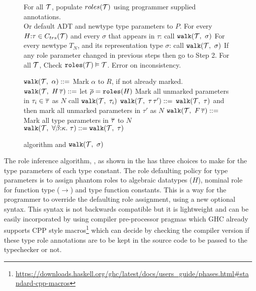 \documentclass[screen,nonacm,manuscript,review]{acmart} %
\begin{document}
\begin{figure}[ht]
  \begin{algorithmic}[1]
    \Procedure{\RoleInfer}{[$\TypeConst$]}

    \State For all $\TypeConst$, populate $roles(\mathcal{T})$ using programmer supplied annotations. \\
    \qquad Or default ADT and newtype type parameters to $P$.
    \State For every $H{:}\tau \in C_{trs}(\mathcal{T})$ and every $\sigma$ that appears in $\tau$: call $\texttt{walk}(\mathcal{T},~\sigma)$\label{here}
    \State For every newtype $T_N$, and its representation type $\sigma$: call $\texttt{walk}(\mathcal{T},~\sigma)$
    \State If any role parameter changed in previous steps then go to Step 2.
    \State For all $\TypeConst$, Check $\texttt{roles}(\mathcal{T}) \mathrel{\vDash} \mathcal{T}$. Error on inconsistency.
    \EndProcedure
  \end{algorithmic}
  \begin{algorithmic}[1]
    \State $\texttt{walk}(\mathcal{T},~\alpha) \mathrel{{:}{:}{=}}$ Mark $\alpha$ to $R$, if not already marked.
    \State $\texttt{walk}(\mathcal{T},~H\, \overline{\tau}) \mathrel{{:}{:}{=}}$ let $\overline{\rho} = \texttt{roles}(H)$
        \State Mark all unmarked parameters in $\tau_i \in \overline{\tau}$ as $N$
        \State call $\texttt{walk}(\mathcal{T},~\tau_i)$
    \EndIf
    \State $\texttt{walk}(\mathcal{T},~\tau\,\tau') \mathrel{{:}{:}{=}}$ $\texttt{walk}(\mathcal{T},~\tau)$ and then mark all unmarked parameters in $\tau'$ as $N$
    \State $\texttt{walk}(\mathcal{T},~F\,\overline{\tau}) \mathrel{{:}{:}{=}}$ Mark all type parameters in $\overline{\tau}$ to $N$
    \State $\texttt{walk}(\mathcal{T},~\forall\beta{:}\kappa.~\tau) \mathrel{{:}{:}{=}} \texttt{walk}(\mathcal{T},~\tau)$
    \EndProcedure
  \end{algorithmic}
\caption{\RoleInfer algorithm and $\texttt{walk}(\mathcal{T},~\sigma)$}\label{alg:role-infer}
\end{figure}

The role inference algorithm, \RoleInfer, as shown in the 
has three choices to make for the type parameters of each type constant.
The role defaulting policy for type parameters is to assign phantom
roles to algebraic datatypes ($H$), nominal role for function type
($\to$) and type function constants. This is a way for the programmer
to override the defaulting role assignment, using a new optional
syntax. This syntax is not backwards compatible but it is lightweight
and can be easily incorporated by using compiler pre-processor pragmas
which GHC already supports CPP style macros\footnote{\url{https://downloads.haskell.org/ghc/latest/docs/users\_guide/phases.html\#standard-cpp-macros}}
which can decide by checking the compiler version if these type role
annotations are to be kept in the source code to be passed to the
typechecker or not.
\end{document}
